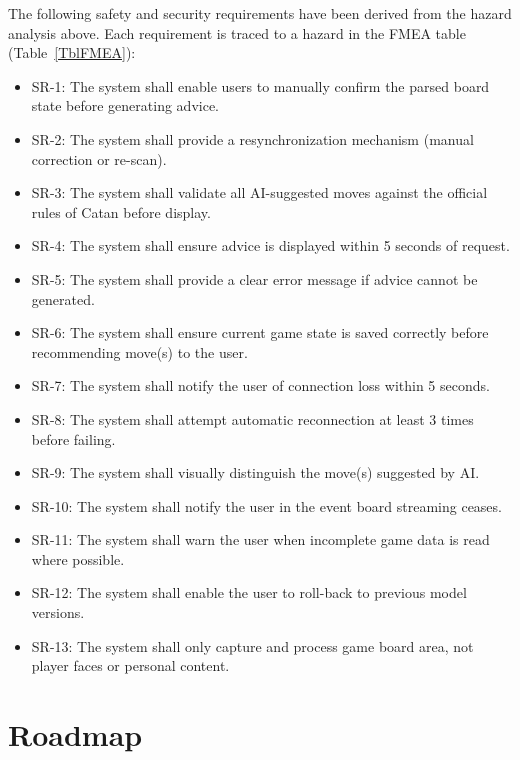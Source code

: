 \documentclass{article}
\begin{document}
The following safety and security requirements have been derived from the hazard analysis above.
Each requirement is traced to a hazard in the FMEA table (Table~\ref{TblFMEA}):

\begin{itemize}
    \item SR-1: The system shall enable users to manually confirm the parsed board state before generating advice.
    \item SR-2: The system shall provide a resynchronization mechanism (manual correction or re-scan).
    \item SR-3: The system shall validate all AI-suggested moves against the official rules of Catan before display.
    \item SR-4: The system shall ensure advice is displayed within 5 seconds of request.
    \item SR-5: The system shall provide a clear error message if advice cannot be generated.
    \item SR-6: The system shall ensure current game state is saved correctly before recommending move(s) to the user.
    \item SR-7: The system shall notify the user of connection loss within 5 seconds.
    \item SR-8: The system shall attempt automatic reconnection at least 3 times before failing.
    \item SR-9: The system shall visually distinguish the move(s) suggested by AI.
    \item SR-10: The system shall notify the user in the event board streaming ceases.
    \item SR-11: The system shall warn the user when incomplete game data is read where possible.
    \item SR-12: The system shall enable the user to roll-back to previous model versions.
    \item SR-13: The system shall only capture and process game board area, not player faces or personal content.
\end{itemize}


\section{Roadmap}\label{sec:roadmap}

\end{document}

